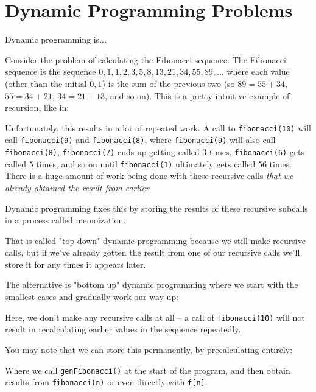 \section{Dynamic Programming Problems}

Dynamic programming is...

Consider the problem of calculating the Fibonacci sequence. The Fibonacci sequence is the sequence $0,1,1,2,3,5,8,13,21,34,55,89,...$ where each value (other than the initial $0,1$) is the sum of the previous two (so $89 = 55 + 34$, $55 = 34 + 21$, $34 = 21 + 13$, and so on). This is a pretty intuitive example of recursion, like in:


Unfortunately, this results in a lot of repeated work. A call to \texttt{fibonacci(10)} will call \texttt{fibonacci(9)} and \texttt{fibonacci(8)}, where \texttt{fibonacci(9)} will also call \texttt{fibonacci(8)}, \texttt{fibonacci(7)} ends up getting called 3 times, \texttt{fibonacci(6)} gets called 5 times, and so on until \texttt{fibonacci(1)} ultimately gets called 56 times. There is a huge amount of work being done with these recursive calls \textit{that we already obtained the result from earlier}.

Dynamic programming fixes this by storing the results of these recursive subcalls in a process called memoization.


That is called "top down" dynamic programming because we still make recursive calls, but if we've already gotten the result from one of our recursive calls we'll store it for any times it appears later.

The alternative is "bottom up" dynamic programming where we start with the smallest cases and gradually work our way up:


Here, we don't make any recursive calls at all -- a call of \texttt{fibonacci(10)} will not result in recalculating earlier values in the sequence repeatedly.

You may note that we can store this permanently, by precalculating entirely:


Where we call \texttt{genFibonacci()} at the start of the program, and then obtain results from \texttt{fibonacci(n)} or even directly with \texttt{f[n]}.

